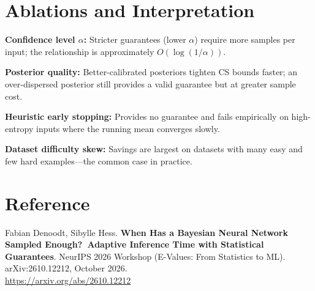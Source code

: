 \documentclass[10pt,twocolumn]{article}
\begin{document}
\section{Ablations and Interpretation}

\textbf{Confidence level $\alpha$:} Stricter guarantees (lower $\alpha$)
require more samples per input; the relationship is approximately
$O(\log(1/\alpha))$.

\textbf{Posterior quality:} Better-calibrated posteriors tighten CS bounds
faster; an over-dispersed posterior still provides a valid guarantee
but at greater sample cost.

\textbf{Heuristic early stopping:} Provides no guarantee and fails
empirically on high-entropy inputs where the running mean converges slowly.

\textbf{Dataset difficulty skew:} Savings are largest on datasets with
many easy and few hard examples---the common case in practice.

\section*{Reference}

Fabian Denoodt, Sibylle Hess.
\textbf{When Has a Bayesian Neural Network Sampled Enough?\ Adaptive
Inference Time with Statistical Guarantees}.
NeurIPS 2026 Workshop (E-Values: From Statistics to ML).
arXiv:2610.12212, October 2026.\\
\url{https://arxiv.org/abs/2610.12212}
\end{document}
